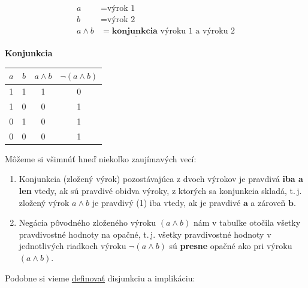 \documentclass{article}
\begin{document}
\begin{center}
\begin{minipage}[c]{0.50\textwidth}
\vspace{2mm}
\[
\begin{aligned}
a &= \text{výrok 1} \\
b &= \text{výrok 2} \\
a \land b &= \underline{\textbf{konjunkcia }}\text{výroku 1 a výroku 2} 
\end{aligned}
\]
\end{minipage}%
\hspace{0.02\textwidth}%
\begin{minipage}[c]{0.42\textwidth}
\centering
\textbf{Konjunkcia} \\[2mm] %
\begin{tabular}{|c|c|c|c|}
\hline
$a$ & $b$ & $a \land b$ & $\neg(a \land b)$ \\ \hline
1 & 1 & 1 & 0 \\ \hline
1 & 0 & 0 & 1 \\ \hline
0 & 1 & 0 & 1 \\ \hline
0 & 0 & 0 & 1 \\ \hline
\end{tabular}
\end{minipage}
\end{center}
\vspace{5mm}
Môžeme si všimnúť hneď niekoľko zaujímavých vecí:
\begin{enumerate}
    \item Konjunkcia (zložený výrok) pozostávajúca z dvoch výrokov je pravdivá \textbf{iba a len} vtedy, ak sú pravdivé obidva výroky, z ktorých sa konjunkcia skladá, t.\,j. zložený výrok $a \land b$ je pravdivý (1) iba vtedy, ak je pravdivé $\textbf{a}$ a zároveň $\textbf{b}$.
    \item Negácia pôvodného zloženého výroku $(a \land b)$ nám v tabuľke otočila všetky pravdivostné hodnoty na opačné, t.\,j. všetky pravdivostné hodnoty v jednotlivých riadkoch výroku $\neg (a \land b)$ sú \textbf{presne} opačné ako pri výroku $(a \land b)$. 
\end{enumerate}
\vspace{10mm}
Podobne si vieme \underline{definovať} disjunkciu a implikáciu:
\vspace{5mm}
\end{document}
